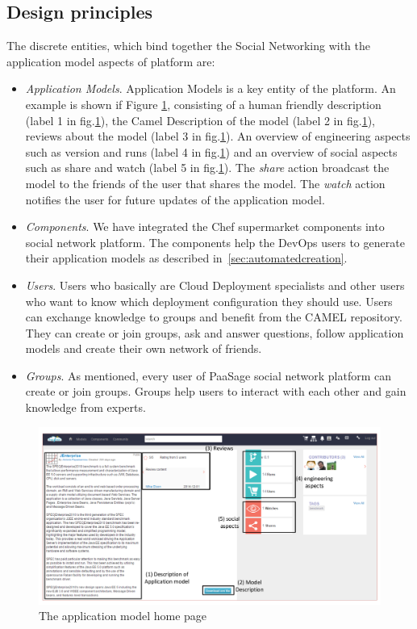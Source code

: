 \subsection{Design principles}
The discrete entities, which bind together the Social Networking with the application model aspects of platform are:
\begin{itemize}
\item \emph{Application Models}. Application Models is a key entity of the platform. An example is shown if Figure \ref{fig:jenter_home}, consisting of a human friendly description (label 1 in fig.\ref{fig:jenter_home}), the Camel Description of the model (label 2 in fig.\ref{fig:jenter_home}), reviews about the model (label 3 in fig.\ref{fig:jenter_home}). An overview of engineering aspects such as version and runs (label 4 in fig.\ref{fig:jenter_home}) and an overview of social aspects such as share and watch (label 5 in fig.\ref{fig:jenter_home}). The {\it share} action broadcast the model to the friends of the user that shares the model. The {\it watch} action notifies the user for future updates of the application model. 
\item \emph{Components}. We have integrated the Chef supermarket components into social network platform. The components help the DevOps users to generate their application models as described in~\ref{sec:automatedcreation}. 
\item \emph{Users}. Users who basically are Cloud Deployment specialists and other users who want to know which deployment configuration they should use. Users can exchange knowledge to groups and benefit from the CAMEL repository. They can create or join groups, ask and answer questions, follow application models and create their own network of friends.
\item \emph{Groups}. As mentioned, every user of PaaSage social network platform can create or join groups. Groups help users to interact with each other and gain knowledge from experts.
\end{itemize}

\begin{figure}[h]
	\centering
	\includegraphics[width=1\textwidth,natwidth=200,natheight=150]{./fig/jenterprise_home_page.pdf}
	\caption{The application model home page}
	\label{fig:jenter_home}
\end{figure}

